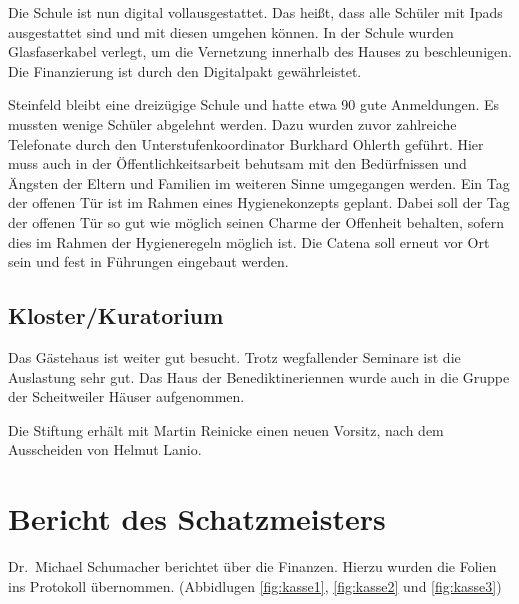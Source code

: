 \documentclass[a4paper, 11pt]{article}
\begin{document}
Die Schule ist nun digital vollausgestattet. Das heißt, dass alle Schüler mit Ipads ausgestattet sind und mit diesen umgehen können.
In der Schule wurden Glasfaserkabel verlegt, um die Vernetzung innerhalb des Hauses zu beschleunigen.
Die Finanzierung ist durch den Digitalpakt gewährleistet.

Steinfeld bleibt eine dreizügige Schule und hatte etwa 90 gute Anmeldungen. Es mussten wenige Schüler abgelehnt werden. Dazu wurden zuvor zahlreiche Telefonate durch den Unterstufenkoordinator Burkhard Ohlerth geführt.
Hier muss auch in der Öffentlichkeitsarbeit behutsam mit den Bedürfnissen und Ängsten der Eltern und Familien im weiteren Sinne umgegangen werden.
Ein Tag der offenen Tür ist im Rahmen eines Hygienekonzepts geplant. Dabei soll der Tag der offenen Tür so gut wie möglich seinen Charme der Offenheit behalten, sofern dies im Rahmen der Hygieneregeln möglich ist.
Die Catena soll erneut vor Ort sein und fest in Führungen eingebaut werden.




\subsection*{Kloster/Kuratorium}

Das Gästehaus ist weiter gut besucht. Trotz wegfallender Seminare ist die Auslastung sehr gut.
Das Haus der Benediktineriennen wurde auch in die Gruppe der Scheitweiler Häuser aufgenommen.

Die Stiftung erhält mit Martin Reinicke einen neuen Vorsitz, nach dem Ausscheiden von Helmut Lanio.


\section*{Bericht des Schatzmeisters}

Dr.~Michael Schumacher berichtet über die Finanzen. Hierzu wurden die Folien ins Protokoll übernommen. (Abbidlugen \ref{fig:kasse1}, \ref{fig:kasse2} und \ref{fig:kasse3})
\end{document}
